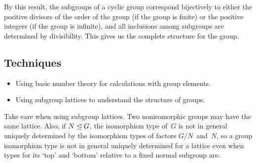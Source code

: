 \begin{rmk}
By this result, the subgroups of a cyclic group correspond bijectively to either the positive divisors of the order of the group (if the group is finite) or the positive integers (if the group is infinite), and all inclusions among subgroups are determined by divisibility. This gives us the complete structure for the group.
\end{rmk}

\subsection*{Techniques}
\begin{itemize}[itemsep=0pt]
\item Using basic number theory for calculations with group elements.
\item Using subgroup lattices to understand the structure of groups.
\end{itemize}

\begin{rmk}
Take care when using subgroup lattices. Two nonisomorphic groups may have the same lattice. Also, if \(N\trianglelefteq G\), the isomorphism type of~\(G\) is not in general uniquely determined by the isomorphism types of factors \(G/N\)~and~\(N\), so a group isomorphism type is not in general uniquely determined for a lattice even when types for its `top' and `bottom' relative to a fixed normal subgroup are.
\end{rmk}
